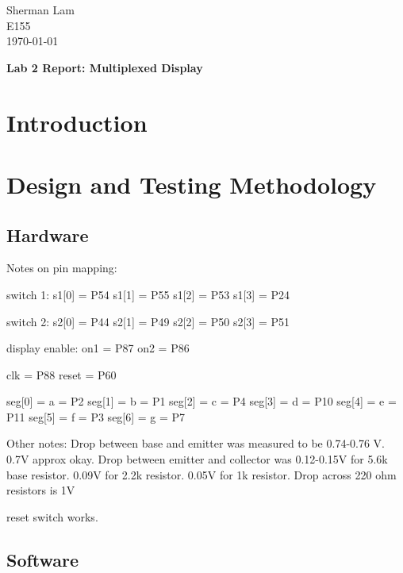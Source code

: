 \documentclass[11pt]{article}
\begin{document}
\begin{flushleft}
Sherman Lam
\\E155
\\ \today
\end{flushleft}


\begin{center}
\begin{Large}
\textbf{Lab 2 Report: Multiplexed Display}
\end{Large}
\end{center}




\section{Introduction}
\label{sec:intro}



\section{Design and Testing Methodology}

\subsection{Hardware}

Notes on pin mapping:

switch 1:
s1[0] = P54
s1[1] = P55
s1[2] = P53
s1[3] = P24

switch 2:
s2[0] = P44
s2[1] = P49
s2[2] = P50
s2[3] = P51

display enable:
on1 = P87
on2 = P86

clk = P88
reset = P60

seg[0] = a = P2
seg[1] = b = P1
seg[2] = c = P4
seg[3] = d = P10
seg[4] = e = P11
seg[5] = f = P3
seg[6] = g = P7


Other notes:
Drop between base and emitter was measured to be 0.74-0.76 V. 0.7V approx okay.
Drop between emitter and collector was 0.12-0.15V for 5.6k base resistor. 0.09V for 2.2k resistor. 0.05V for 1k resistor. 
Drop across 220 ohm resistors is 1V

reset switch works.


\subsection{Software}
\end{document}
